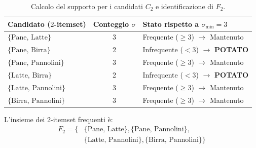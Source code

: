 \begin{table}[H]
\centering
\small
\renewcommand{\arraystretch}{1.2}
\begin{tabular}{l c l}
\toprule
\textbf{Candidato ($2$-itemset)} & \textbf{Conteggio $\sigma$} & \textbf{Stato rispetto a $\sigma_{\min} = 3$} \\
\midrule
$\{\text{Pane, Latte}\}$ & 3 & Frequente ($\ge 3$) $\rightarrow$ Mantenuto \\
$\{\text{Pane, Birra}\}$ & 2 & Infrequente ($< 3$) $\rightarrow$ \textbf{POTATO} \\
$\{\text{Pane, Pannolini}\}$ & 3 & Frequente ($\ge 3$) $\rightarrow$ Mantenuto \\
$\{\text{Latte, Birra}\}$ & 2 & Infrequente ($< 3$) $\rightarrow$ \textbf{POTATO} \\
$\{\text{Latte, Pannolini}\}$ & 3 & Frequente ($\ge 3$) $\rightarrow$ Mantenuto \\
$\{\text{Birra, Pannolini}\}$ & 3 & Frequente ($\ge 3$) $\rightarrow$ Mantenuto \\
\bottomrule
\end{tabular}
\caption{Calcolo del supporto per i candidati $C_2$ e identificazione di $F_2$.}
\label{tab:dm-apriori-f2}
\end{table}

L'insieme dei 2-itemset frequenti è:
\begin{equation}
\begin{split}
F_2 = \{ & \{\text{Pane, Latte}\}, \{\text{Pane, Pannolini}\}, \\
& \{\text{Latte, Pannolini}\}, \{\text{Birra, Pannolini}\} \}
\end{split}
\end{equation}

\FloatBarrier
